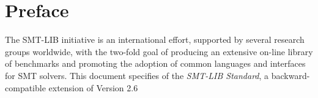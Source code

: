 

\chapter*{Preface}


The SMT-LIB initiative is an international effort, 
supported by several research groups worldwide, 
with the two-fold goal of producing an extensive on-line library of benchmarks and
promoting the adoption of common languages and interfaces for SMT solvers. 
This document specifies \thisversion of the \emph{SMT-LIB Standard},
a backward-compatible extension of Version 2.6
\medskip

\thispagestyle{empty}
